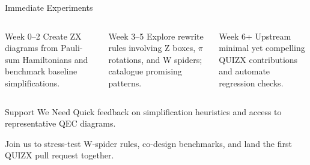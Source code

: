 \documentclass[aspectratio=169]{beamer}
\begin{document}
\begin{frame}[t]{Immediate Experiments}
  \begin{columns}[T,onlytextwidth]
      \begin{block}{Week 0--2}
        \small Create ZX diagrams from Pauli-sum Hamiltonians and benchmark baseline simplifications.
      \end{block}
      \begin{block}{Week 3--5}
        \small Explore rewrite rules involving Z boxes, \(\pi\) rotations, and W spiders; catalogue promising patterns.
      \end{block}
      \begin{block}{Week 6+}
        \small Upstream minimal yet compelling QUIZX contributions and automate regression checks.
      \end{block}
  \end{columns}
  \vspace{0.3cm}
  \begin{alertblock}{Support We Need}
    Quick feedback on simplification heuristics and access to representative QEC diagrams.
  \end{alertblock}
\end{frame}

\begin{frame}[plain]
  \centering
  \vfill
  {\Large Join us to stress-test W-spider rules, co-design benchmarks, and land the first QUIZX pull request together.}
  \vfill
\end{frame}
\end{document}
